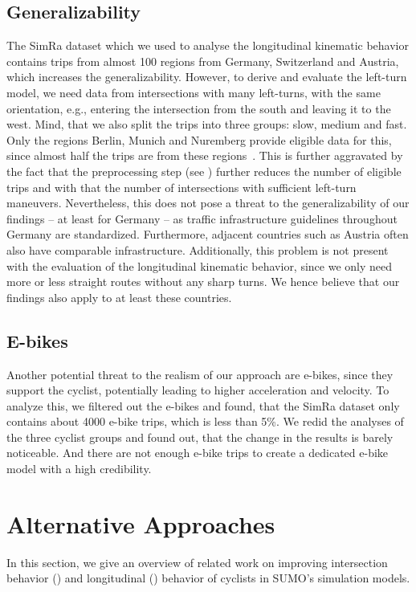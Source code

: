 \subsection{Generalizability}%
\label{subsec:problem_general}
The SimRa dataset which we used to analyse the longitudinal kinematic behavior contains trips from almost \num{100} regions from Germany, Switzerland and Austria, which increases the generalizability.
However, to derive and evaluate the left-turn model, we need data from intersections with many left-turns, with the same orientation, e.g., entering the intersection from the south and leaving it to the west.
Mind, that we also split the trips into three groups: slow, medium and fast.
Only the regions Berlin, Munich and Nuremberg provide eligible data for this, since almost half the trips are from these regions~\cite{karakaya2022cyclesense}.
This is further aggravated by the fact that the preprocessing step (see ) further reduces the number of eligible trips and with that the number of intersections with sufficient left-turn maneuvers.
Nevertheless, this does not pose a threat to the generalizability of our findings -- at least for Germany -- as traffic infrastructure guidelines throughout Germany are standardized.
Furthermore, adjacent countries such as Austria often also have comparable infrastructure.
Additionally, this problem is not present with the evaluation of the longitudinal kinematic behavior, since we only need more or less straight routes without any sharp turns.
We hence believe that our findings also apply to at least these countries.

\subsection{E-bikes}
\label{subsec:e-bikes}
Another potential threat to the realism of our approach are e-bikes, since they support the cyclist, potentially leading to higher acceleration and velocity.
To analyze this, we filtered out the e-bikes and found, that the SimRa dataset only contains about \num{4000} e-bike trips, which is less than \num{5}\%.
We redid the analyses of the three cyclist groups and found out, that the change in the results is barely noticeable.
And there are not enough e-bike trips to create a dedicated e-bike model with a high credibility.


\section{Alternative Approaches}
\label{sec:related_work_sumo}
In this section, we give an overview of related work on improving intersection behavior () and longitudinal () behavior of cyclists in SUMO's simulation models.

